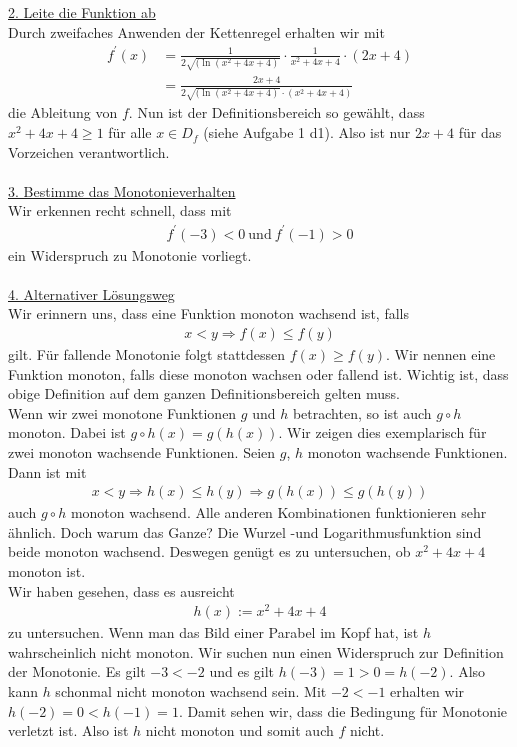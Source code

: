\underline{2. Leite die Funktion ab}\\
Durch zweifaches Anwenden der Kettenregel erhalten wir mit
\begin{align*}
f^\prime(x) &= \frac{1}{2\sqrt{(\ln(x^2+4x+4)}} \cdot \frac{1}{x^2+4x+4}\cdot (2x+4)\\
&= \frac{2x+4}{2\sqrt{(\ln(x^2+4x+4)}\cdot(x^2+4x+4)}
\end{align*}
die Ableitung von $f$. Nun ist der Definitionsbereich so gewählt, dass $x^2 +4x+4 \geq 1$ für alle $x \in D_f$ (siehe Aufgabe 1 d1). Also ist nur $2x +4 $ für das Vorzeichen verantwortlich.
\\
\\
\underline{3. Bestimme das Monotonieverhalten}\\ 
Wir erkennen recht schnell, dass mit
\begin{align*}
f^\prime(-3) < 0 \ \text{und} \ f^\prime(-1)>0
\end{align*}
ein Widerspruch zu Monotonie vorliegt.
\\
\\
\underline{4. Alternativer Lösungsweg}\\
Wir erinnern uns, dass eine Funktion monoton wachsend ist, falls
\begin{align*}
x < y \Rightarrow f(x) \leq f(y)
\end{align*}
gilt. Für fallende Monotonie folgt stattdessen $f(x) \geq f(y)$.
Wir nennen eine Funktion monoton, falls diese monoton wachsen oder fallend ist.
Wichtig ist, dass obige Definition auf dem ganzen Definitionsbereich gelten muss.
\\
Wenn wir zwei monotone Funktionen $g$ und $h$ betrachten, so ist auch $g \circ h$ monoton. Dabei ist $g\circ h(x) = g(h(x))$. Wir zeigen dies exemplarisch für zwei monoton wachsende Funktionen. Seien $g$, $h$ monoton wachsende Funktionen. Dann ist mit
\begin{align*}
x < y \Rightarrow h(x) \leq h(y) \Rightarrow g(h(x)) \leq g(h(y))
\end{align*} 
auch $g\circ h$ monoton wachsend.
Alle anderen Kombinationen funktionieren sehr ähnlich.
Doch warum das Ganze?
Die Wurzel -und Logarithmusfunktion sind beide monoton wachsend. Deswegen genügt es zu untersuchen, ob $x^2+4x+4$ monoton ist.
\\
Wir haben gesehen, dass es ausreicht
\begin{align*}
h(x) := x^2 + 4x + 4
\end{align*}
zu untersuchen. Wenn man das Bild einer Parabel im Kopf hat, ist $h$ wahrscheinlich nicht monoton. Wir suchen nun einen Widerspruch zur Definition der Monotonie.
Es gilt $-3 < -2 $ und es gilt $h(-3) =1 > 0 = h(-2)$. Also kann $h$ schonmal nicht monoton wachsend sein. Mit $-2 < -1$ erhalten wir $h(-2) =0 < h(-1) = 1$. 
Damit sehen wir, dass die Bedingung für Monotonie verletzt ist.
Also ist $h$ nicht monoton und somit auch $f$ nicht.


\newpage
